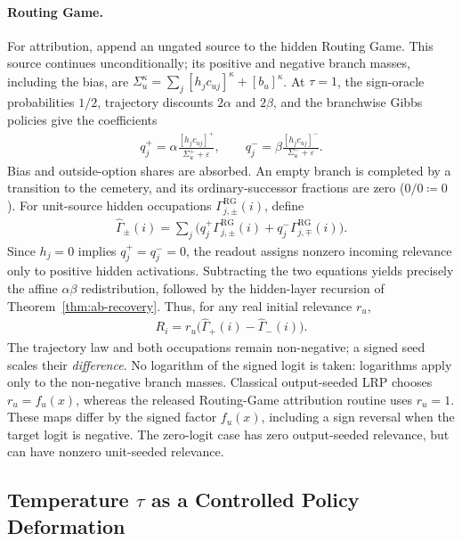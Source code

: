 \documentclass[twoside]{article}
\newcommand{\1}{\mathbf{1}}
\begin{document}
\paragraph{Routing Game.}
For attribution, append an ungated source to the hidden Routing Game. This source continues
unconditionally; its positive and negative branch masses, including the bias, are
$\Sigma_u^\kappa=\sum_j[h_jc_{uj}]^\kappa+[b_u]^\kappa$.
At $\tau=1$, the sign-oracle probabilities $1/2$, trajectory discounts $2\alpha$ and $2\beta$,
and the branchwise Gibbs policies give the coefficients
\begin{align}\label{eq:affine-readout-routing}
    q_j^+=\alpha\frac{[h_jc_{uj}]^+}{\Sigma_u^++\varepsilon},
    \qquad q_j^-=\beta\frac{[h_jc_{uj}]^-}{\Sigma_u^-+\varepsilon}.
\end{align}
Bias and outside-option shares are absorbed. An empty branch is completed by a transition to
the cemetery, and its ordinary-successor fractions are zero ($0/0\coloneqq0$).
For unit-source hidden occupations $\Gamma^{\mathrm{RG}}_{j,\pm}(i)$, define
\begin{align}\label{eq:affine-readout-occupation}
    \widehat\Gamma_\pm(i)=\sum_j\bigl(
    q_j^+\Gamma^{\mathrm{RG}}_{j,\pm}(i)
    +q_j^-\Gamma^{\mathrm{RG}}_{j,\mp}(i)\bigr).
\end{align}
Since $h_j=0$ implies $q_j^+=q_j^-=0$, the readout assigns nonzero incoming relevance only
to positive hidden activations. Subtracting the two equations yields precisely the affine
$\alpha\beta$ redistribution, followed by the hidden-layer recursion of Theorem~\ref{thm:ab-recovery}. Thus, for any real
initial relevance $r_u$,
\begin{align}\label{eq:affine-readout-relevance}
    R_i=r_u\bigl(\widehat\Gamma_+(i)-\widehat\Gamma_-(i)\bigr).
\end{align}
The trajectory law and both occupations remain non-negative; a signed seed scales their
\emph{difference}. No logarithm of the signed logit is taken: logarithms apply only to the
non-negative branch masses. Classical output-seeded LRP chooses $r_u=f_u(x)$, whereas the
released Routing-Game attribution routine uses $r_u=1$. These maps differ by the signed factor
$f_u(x)$, including a sign reversal when the target logit is negative. The zero-logit case
has zero output-seeded relevance, but can have nonzero unit-seeded relevance.

\subsection{Temperature \texorpdfstring{$\tau$}{tau} as a Controlled Policy Deformation}\label{app:routing-temp}
\end{document}
